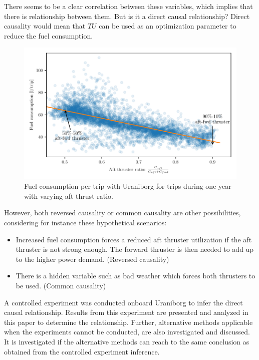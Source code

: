 There seems to be a clear correlation between these variables,  which implies that there is relationship between them. But is it a direct causal relationship? Direct causality would mean that $TU$ can be used as an optimization parameter to reduce the fuel consumption.
\begin{figure}[!htb]
    \centering
    \includegraphics[width=\textwidth]{figures/correlation.pdf}
    \caption{Fuel consumption per trip with Uraniborg for trips during one year with varying aft thrust ratio.}
    \label{fig:fuel_consumption_correlation}
\end{figure}
However, both reversed causality or common causality are other possibilities, considering for instance these hypothetical scenarios:
\begin{itemize}
    \item Increased fuel consumption forces a reduced aft thruster utilization if the aft thruster is not strong enough. The forward thruster is then needed to add up to the higher power demand. (Reversed causality)

    \item There is a hidden variable such as bad weather which forces both thrusters to be used. (Common causality)
\end{itemize}

A controlled experiment was conducted onboard Uraniborg to infer the direct causal relationship. Results from this experiment are presented and analyzed in this paper to determine the relationship. Further, alternative methods applicable when the experiments cannot be conducted, are also investigated and discussed. It is investigated if the alternative methods can reach to the same conclusion as obtained from the controlled experiment inference.